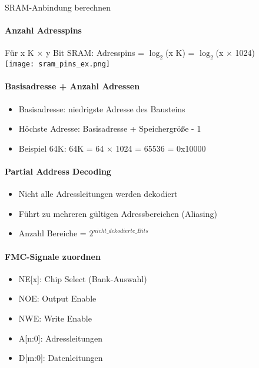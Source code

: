 \begin{KR}{SRAM-Anbindung berechnen}
    \paragraph{Anzahl Adresspins}
    Für x K $\times$ y Bit SRAM: Adresspins = $\log_2$(x K) = $\log_2$(x $\times$ 1024)\\
    \texttt{[image: sram\_pins\_ex.png]}
    
    \paragraph{Basisadresse + Anzahl Adressen}
    \begin{itemize}
        \item Basisadresse: niedrigste Adresse des Bausteins
        \item Höchste Adresse: Basisadresse + Speichergröße - 1
        \item Beispiel 64K: 64K = 64 $\times$ 1024 = 65536 = 0x10000
    \end{itemize}
    
    \paragraph{Partial Address Decoding}
    \begin{itemize}
        \item Nicht alle Adressleitungen werden dekodiert
        \item Führt zu mehreren gültigen Adressbereichen (Aliasing)
        \item Anzahl Bereiche = $2^{nicht\_dekodierte\_Bits}$
    \end{itemize}
    
    \paragraph{FMC-Signale zuordnen}
    \begin{itemize}
        \item NE[x]: Chip Select (Bank-Auswahl)
        \item NOE: Output Enable
        \item NWE: Write Enable
        \item A[n:0]: Adressleitungen
        \item D[m:0]: Datenleitungen
    \end{itemize}
\end{KR}

